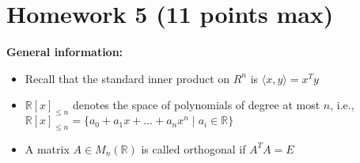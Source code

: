 \documentclass{article}
\begin{document}
\section*{Homework 5 (11 points max)}

\noindent\textbf{General information:} \\
\begin{itemize}
  \item Recall that the standard inner product on $R^n$ is  $\langle x, y\rangle = x^Ty$
  \item $\mathbb{R}[x]_{\leq n}$ denotes the space of polynomials of degree 
  at most $n$, i.e., $\mathbb{R}[x]_{\leq n} = \{a_0 + a_1x + \dots + a_nx^n \mid a_i \in \mathbb{R}\}$
  \item A matrix $A \in M_n(\mathbb{R})$ is called orthogonal if $A^TA = E$
\end{itemize}
\end{document}
